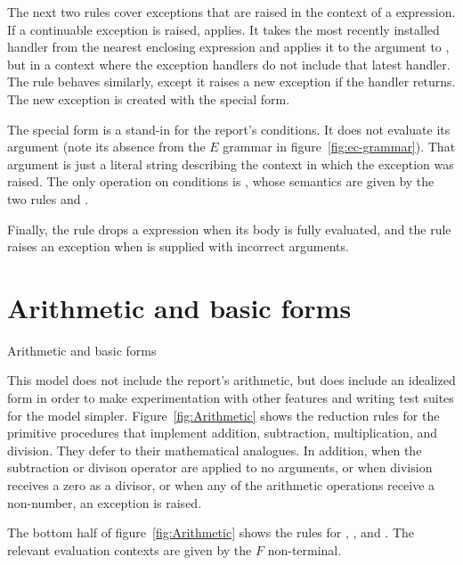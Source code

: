 The next two rules cover exceptions that are raised in the context of
a  expression. If a continuable exception is raised,
 applies. It takes the most recently installed
handler from the nearest enclosing  expression and
applies it to the argument to , but in a
context where the exception handlers do not include that latest
handler. The  rule behaves similarly, except it
raises a new exception if the handler returns. The new exception is
created with the  special form.

The  special form is a stand-in for the report's
conditions. It does not evaluate its argument (note its absence from
the $E$ grammar in figure~\ref{fig:ec-grammar}). That argument
is just a literal string describing the context in which the exception
was raised. The only operation on conditions is ,
whose semantics are given by the two rules  and
.

Finally, the rule  drops a  expression
when its body is fully evaluated, and the rule 
raises an exception when  is supplied with
incorrect arguments.

\section{Arithmetic and basic forms}

\beginfig
\begin{center}


\end{center}
\caption{Arithmetic and basic forms}\label{fig:Arithmetic}
\endfig

This model does not include the report's arithmetic, but does include
an idealized form in order to make experimentation with other features
and writing test suites for the model simpler.
Figure~\ref{fig:Arithmetic} shows the reduction rules for the
primitive procedures that implement addition, subtraction,
multiplication, and division. They defer to their mathematical
analogues. In addition, when the subtraction or divison operator are
applied to no arguments, or when division receives a zero as a
divisor, or when any of the arithmetic operations receive a
non-number, an exception is raised.

The bottom half of figure~\ref{fig:Arithmetic} shows the rules for
, , and . The relevant
evaluation contexts are given by the $F$ non-terminal.

